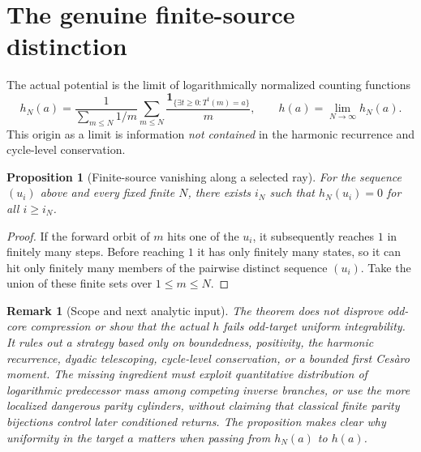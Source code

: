 \documentclass[11pt,a4paper]{article}
\newtheorem{remark}[theorem]{Remark}
\newtheorem{proposition}[theorem]{Proposition}
\newcommand{\one}{\mathbf 1}
\begin{document}
\section{The genuine finite-source distinction}
The actual potential is the limit of logarithmically normalized
counting functions
\[
 h_N(a)=\frac1{\sum_{m\le N}1/m}
 \sum_{m\le N}\frac{\one_{\{\exists t\ge0:T^t(m)=a\}}}{m},
 \qquad h(a)=\lim_{N\to\infty}h_N(a).
\]
This origin as a limit is information \emph{not contained} in the
harmonic recurrence and cycle-level conservation.
\begin{proposition}[Finite-source vanishing along a selected ray]
For the sequence $(u_i)$ above and every fixed finite $N$,
there exists $i_N$ such that $h_N(u_i)=0$ for all $i\ge i_N$.
\end{proposition}
\begin{proof}
If the forward orbit of $m$ hits one of the $u_i$, it subsequently
reaches $1$ in finitely many steps.  Before reaching $1$ it has
only finitely many states, so it can hit only finitely many members
of the pairwise distinct sequence $(u_i)$.  Take the union of these
finite sets over $1\le m\le N$.
\end{proof}
\begin{remark}[Scope and next analytic input]
The theorem does \emph{not} disprove odd-core compression or show that
the actual $h$ fails odd-target uniform integrability.  It rules out
a strategy based only on boundedness, positivity, the harmonic
recurrence, dyadic telescoping, cycle-level conservation, or a bounded
first Ces\`aro moment.  The missing ingredient must exploit
quantitative \emph{distribution of logarithmic predecessor mass among
competing inverse branches}, or use the more localized dangerous
parity cylinders, without claiming that classical finite parity
bijections control later conditioned returns.  The proposition makes
clear why uniformity in the target $a$ matters when passing from
$h_N(a)$ to $h(a)$.
\end{remark}
\end{document}
